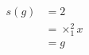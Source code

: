 \documentclass[preview]{standalone}
\begin{document}
\begin{align*}
s(g) &= 2 \\&= \times_1^2 x \\&= g
\end{align*}
\end{document}
